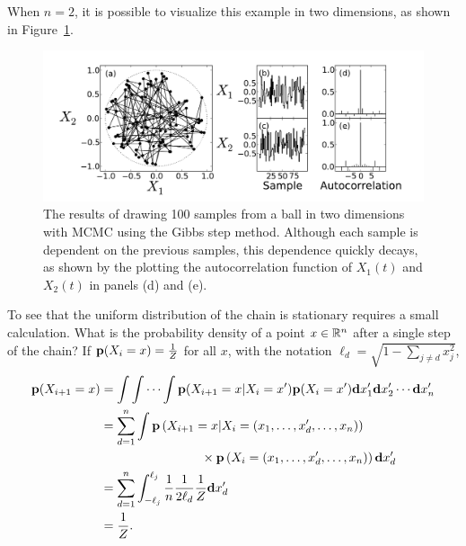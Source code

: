 When $n=2$, it is possible to visualize this example in two dimensions, as shown in Figure~\ref{gibbs-ball}.

\begin{figure}[ht]
\begin{center}
\includegraphics[width=\textwidth]{gibbs-ball.pdf}
\caption{The results of drawing 100 samples from a ball in two
  dimensions with MCMC using the Gibbs step method.  Although each
  sample is dependent on the previous samples, this dependence quickly
  decays, as shown by the plotting the autocorrelation function of
  $X_1(t)$ and $X_2(t)$ in panels (d) and (e).}
\label{gibbs-ball}
\end{center}
\end{figure}


To see that the uniform distribution of the chain is stationary
requires a small calculation.  What is the probability density of a
point $x \in \mathbb{R}^n$ after a single step of the chain?  If
$\mathbf{p}(X_i=x) = \frac{1}{Z}$ for all $x$, with the notation
$\ell_d = \sqrt{1-\sum_{j \neq d} x_j^2}$,
\begin{align*}
\mathbf{p}(X_{i+1}=x) &= \int\int\cdots\int \mathbf{p}(X_{i+1}=x|X_i=x') \mathbf{p}(X_i=x')\mathbf{d} x'_1 \mathbf{d} x'_2 \cdots \mathbf{d} x'_n\\
&=\sum_{d=1}^n \int \mathbf{p}\left(X_{i+1}=x | X_i = (x_1, \ldots, x'_d, \ldots, x_n)\right)\\
&\qquad\qquad\qquad\qquad\times \mathbf{p}\left(X_i = (x_1, \ldots, x'_d, \ldots, x_n)\right)\mathbf{d} x'_d\\
&=\sum_{d=1}^n \int_{-\ell_j}^{\ell_j} \frac{1}{n} \frac{1}{2\ell_d} \frac{1}{Z} \mathbf{d} x'_d\\
&=\frac{1}{Z}.
\end{align*}


